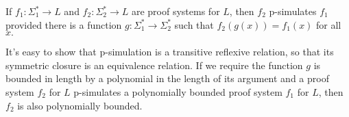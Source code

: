 \documentclass{article}
\begin{document}
\else
\fi

\begin{Define}
  \begin{define}
    If $f_1: \Sigma_1^* \rightarrow L$ and $f_2: \Sigma_2^* \rightarrow L$ are proof systems for $L$, then $f_2$ p-simulates $f_1$ provided there is a function $g:\Sigma_1^* \rightarrow \Sigma_2^*$ such that $f_2(g(x)) = f_1(x)$ for all $x.$
  \end{define}
\end{Define}

It's easy to show that p-simulation is a transitive reflexive relation, so that its symmetric closure is an equivalence relation. If we require the function $g$ is bounded in length by a polynomial in the length of its argument and a proof system $f_2$ for $L$ p-simulates a polynomially bounded proof system $f_1$ for $L$, then $f_2$ is also polynomially bounded.

\ifx\allfiles\undefined
  
\end{document}
